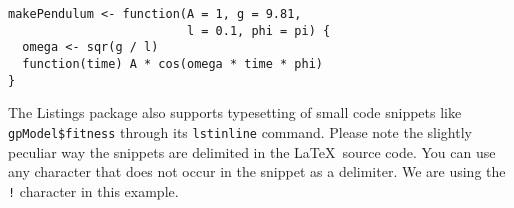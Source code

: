 \begin{lstlisting}[caption = {Some Example \R Code}, label = lstExample]
makePendulum <- function(A = 1, g = 9.81,
                         l = 0.1, phi = pi) {
  omega <- sqr(g / l)
  function(time) A * cos(omega * time * phi)
}
\end{lstlisting}

The {\sf Listings} package also supports typesetting of small code snippets like
\lstinline!gpModel$fitness! through its {\tt lstinline} command. Please note the slightly peculiar way
the snippets are delimited in the \LaTeX~source code. You can use any character that does not occur
in the snippet as a delimiter. We are using the {\tt !} character in this example.
